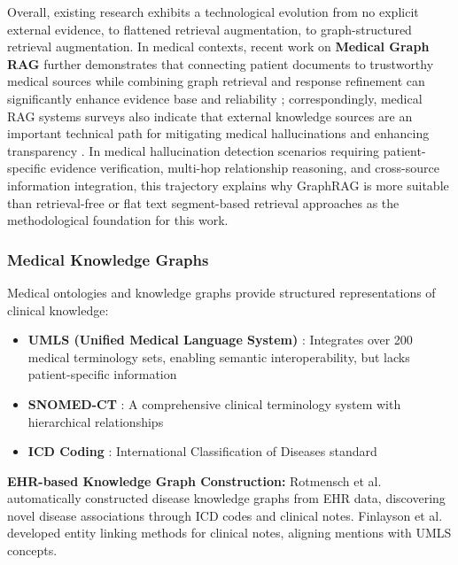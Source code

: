 \documentclass[11pt]{article}
\begin{document}
Overall, existing research exhibits a technological evolution from no explicit external evidence, to flattened retrieval augmentation, to graph-structured retrieval augmentation. In medical contexts, recent work on \textbf{Medical Graph RAG} further demonstrates that connecting patient documents to trustworthy medical sources while combining graph retrieval and response refinement can significantly enhance evidence base and reliability \citep{wu2025medicalGraphRAG}; correspondingly, medical RAG systems surveys also indicate that external knowledge sources are an important technical path for mitigating medical hallucinations and enhancing transparency \citep{amugongo2025healthcareRAGReview}. In medical hallucination detection scenarios requiring patient-specific evidence verification, multi-hop relationship reasoning, and cross-source information integration, this trajectory explains why GraphRAG is more suitable than retrieval-free or flat text segment-based retrieval approaches as the methodological foundation for this work.

\subsubsection{Medical Knowledge Graphs}

Medical ontologies and knowledge graphs provide structured representations of clinical knowledge:

\begin{itemize}
\item
  \textbf{UMLS (Unified Medical Language System)} \citep{bodenreider2004umls}: Integrates over 200 medical terminology sets, enabling semantic interoperability, but lacks patient-specific information
\item
  \textbf{SNOMED-CT} \citep{donnelly2006snomedCt}: A comprehensive clinical terminology system with hierarchical relationships
\item
  \textbf{ICD Coding} \citep{who2016icd10}: International Classification of Diseases standard
\end{itemize}

\textbf{EHR-based Knowledge Graph Construction:} Rotmensch et al.~\citep{rotmensch2017healthKnowledgeGraph} automatically constructed disease knowledge graphs from EHR data, discovering novel disease associations through ICD codes and clinical notes. Finlayson et al.~\citep{finlayson2014graphMedicine} developed entity linking methods for clinical notes, aligning mentions with UMLS concepts.
\end{document}
